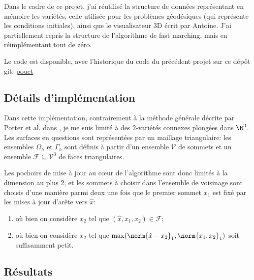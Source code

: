 \documentclass[math, info]{mpb-cours}
\begin{document}
\smallskip

Dans le cadre de ce projet, j'ai réutilisé la structure de données représentant en mémoire les variétés,
celle utilisée pour les problèmes géodésiques (qui représente les conditions initiales),
ainsi que le visualisateur 3D écrit par Antoine.
J'ai partiellement repris la structure de l'algorithme de fast marching, mais en réimplémentant tout de
zéro.

Le code est disponible, avec l'historique du code du précédent projet sur ce dépôt git: \url{pouet}

\subsection{Détails d'implémentation}
Dans cette implémentation, contrairement à la méthode générale décrite par Potter et al. dans
\cite{potter2021jetmarchingmethodssolving}, je me suis limité à des $2$-variétés connexes plongées
dans $\R^{3}$.
Les surfaces en questions sont représentées par un maillage triangulaire: les ensembles $\Omega_{h}$ et
$\Gamma_{h}$ sont définis à partir d'un ensemble $\mathcal{V}$ de sommets et un ensemble
$\mathcal{F}\subseteq \mathcal{V}^{3}$ de faces triangulaires.

Les pochoirs de mise à jour au c\oe ur de l'algorithme sont donc limités à la dimension au plus $2$, et les
sommets à choisir dans l'ensemble de voisinage sont choisis d'une manière parmi deux une fois que le premier
sommet $x_{1}$ est fixé par les mises à jour d'arête vers $\hat{x}$:
\begin{enumerate}
	\item où bien on considère $x_{2}$ tel que $(\hat{x}, x_{1}, x_{2}) \in \mathcal{F}$;
	\item où bien on considère $x_{2}$ tel que $\max(\norm{\hat{x} - x_{2}}_{1}, \norm{x_{1}, x_{2}}_{1})$
	      soit suffisamment petit.
\end{enumerate}

\subsection{Résultats}



\end{document}
